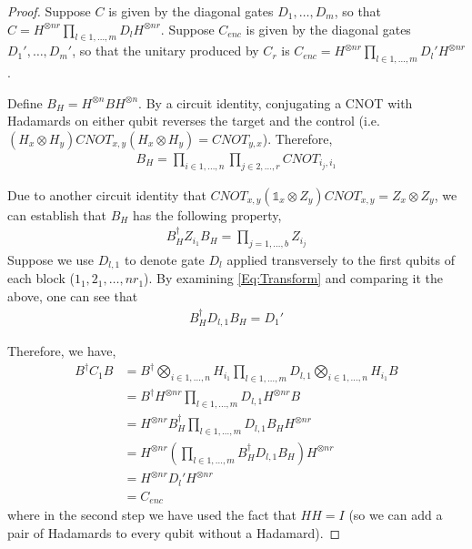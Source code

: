 \documentclass[a4paper,onecolumn,11pt,accepted=2017-05-09]{quantumarticle}
\newcommand{\ident}{\mathds{1}}
\begin{document}
\begin{proof}
Suppose $C$ is given by the diagonal gates $D_1,\ldots,D_m$, so that $C =  H^{\otimes nr} \prod_{l \in 1,\ldots,m} D_l H^{\otimes nr}$. Suppose $C_{enc}$ is given by the diagonal gates $D_{1}',\ldots,D_{m}'$, so that the unitary produced by $C_r$ is $C_{enc} = H^{\otimes nr} \prod_{l \in 1,\ldots,m} D_{l}' H^{\otimes nr}$. 

Define $B_H =H^{\otimes n} B H^{\otimes n}$. By a circuit identity, conjugating a CNOT with Hadamards on either qubit reverses the target and the control (i.e. $(H_x \otimes H_y)CNOT_{x,y}(H_x \otimes H_y) = CNOT_{y,x}$). Therefore,
\begin{align}
    B_H = \prod_{i \in 1,\ldots,n}\prod_{j \in 2,\ldots,r}CNOT_{i_j,i_1}
\end{align}

Due to another circuit identity that $CNOT_{x,y}(\ident_x \otimes Z_y)CNOT_{x,y} =Z_x \otimes Z_y$, we can establish that $B_H$ has the following property,
\begin{align}
    B_H^\dagger Z_{i_1}B_H = \prod_{j =1,\ldots,b} Z_{i_j}
\end{align}
Suppose we use $D_{l,1}$ to denote gate $D_l$ applied transversely to the first qubits of each block ($1_1,2_1,\ldots,nr_1$). By examining \cref{Eq:Transform} and comparing it the above, one can see that
\begin{align}
    B_H^\dagger D_{l,1}B_H = D_{1}'
\end{align}

Therefore, we have,
\begin{align}
    B^\dagger C_{1} B &= B^\dagger \bigotimes_{i \in 1,\ldots,n} H_{i_1} \prod_{l \in 1,\ldots,m} D_{l,1} \bigotimes_{i \in 1,\ldots,n} H_{i_1} B \\
    &= B^\dagger H^{\otimes nr} \prod_{l \in 1,\ldots,m} D_{l,1} H^{\otimes nr} B \\
    &=  H^{\otimes nr} B_H^\dagger \prod_{l \in 1,\ldots,m} D_{l,1} B_H H^{\otimes nr}\\
    &= H^{\otimes nr} \left( \prod_{l \in 1,\ldots,m} B_H^\dagger D_{l,1} B_H\right) H^{\otimes nr}\\
    &= H^{\otimes nr} D_{l}'  H^{\otimes nr}\\
    &= C_{enc}
\end{align}
where in the second step we have used the fact that $H H = I$ (so we can add a pair of Hadamards to every qubit without a Hadamard).
\end{proof}
\end{document}
